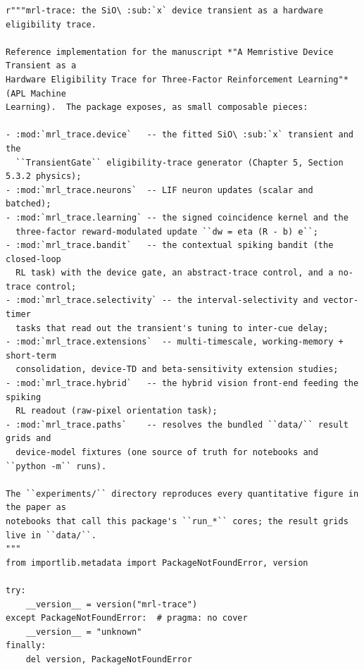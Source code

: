\begin{lstlisting}[caption={mrl\_trace/\_\_init\_\_.py},label={lst:siox-src-__init__}]
r"""mrl-trace: the SiO\ :sub:`x` device transient as a hardware eligibility trace.

Reference implementation for the manuscript *"A Memristive Device Transient as a
Hardware Eligibility Trace for Three-Factor Reinforcement Learning"* (APL Machine
Learning).  The package exposes, as small composable pieces:

- :mod:`mrl_trace.device`   -- the fitted SiO\ :sub:`x` transient and the
  ``TransientGate`` eligibility-trace generator (Chapter 5, Section 5.3.2 physics);
- :mod:`mrl_trace.neurons`  -- LIF neuron updates (scalar and batched);
- :mod:`mrl_trace.learning` -- the signed coincidence kernel and the
  three-factor reward-modulated update ``dw = eta (R - b) e``;
- :mod:`mrl_trace.bandit`   -- the contextual spiking bandit (the closed-loop
  RL task) with the device gate, an abstract-trace control, and a no-trace control;
- :mod:`mrl_trace.selectivity` -- the interval-selectivity and vector-timer
  tasks that read out the transient's tuning to inter-cue delay;
- :mod:`mrl_trace.extensions`  -- multi-timescale, working-memory + short-term
  consolidation, device-TD and beta-sensitivity extension studies;
- :mod:`mrl_trace.hybrid`   -- the hybrid vision front-end feeding the spiking
  RL readout (raw-pixel orientation task);
- :mod:`mrl_trace.paths`    -- resolves the bundled ``data/`` result grids and
  device-model fixtures (one source of truth for notebooks and ``python -m`` runs).

The ``experiments/`` directory reproduces every quantitative figure in the paper as
notebooks that call this package's ``run_*`` cores; the result grids live in ``data/``.
"""
from importlib.metadata import PackageNotFoundError, version

try:
    __version__ = version("mrl-trace")
except PackageNotFoundError:  # pragma: no cover
    __version__ = "unknown"
finally:
    del version, PackageNotFoundError


\end{lstlisting}
